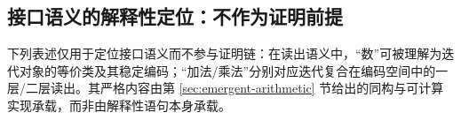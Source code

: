 \subsection{接口语义的解释性定位：不作为证明前提}\label{subsec:discussion-semantic-positioning}
下列表述仅用于定位接口语义而不参与证明链：在读出语义中，“数”可被理解为迭代对象的等价类及其稳定编码；“加法/乘法”分别对应迭代复合在编码空间中的一层/二层读出。其严格内容由第 \ref{sec:emergent-arithmetic} 节给出的同构与可计算实现承载，而非由解释性语句本身承载。
